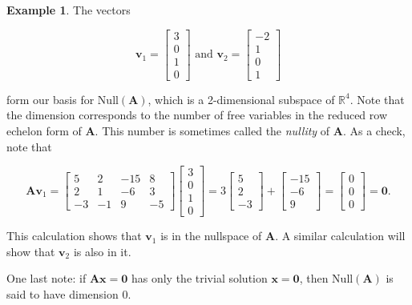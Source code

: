 \documentclass[
]{book}
\theoremstyle{definition}
\theoremstyle{definition}
\newtheorem{example}{Example}[chapter]
\theoremstyle{definition}
\theoremstyle{definition}
\theoremstyle{remark}
\begin{document}
\begin{examplebox}
\begin{example}
The vectors

\[\mathbf{v}_1=\begin{bmatrix}3\\0\\1\\0\end{bmatrix} \text{ and } \mathbf{v}_2=\begin{bmatrix}-2\\1\\0\\1\end{bmatrix}\]

form our basis for \(\text{Null}(\mathbf{A})\), which is a 2-dimensional subspace of \(\mathbb{R}^4\). Note that the dimension corresponds to the number of free variables in the reduced row echelon form of \(\mathbf{A}.\) This number is sometimes called the \emph{nullity} of \(\mathbf{A}.\) As a check, note that

\[\mathbf{A}\mathbf{v}_1=\begin{bmatrix}5 & 2 & -15 & 8\\2 & 1 & -6 & 3\\-3 & -1 & 9 & -5\end{bmatrix}\begin{bmatrix}3\\0\\1\\0\end{bmatrix}=3\begin{bmatrix}5\\2\\-3\end{bmatrix}+\begin{bmatrix}-15\\-6\\9\end{bmatrix}=\begin{bmatrix}0\\0\\0\end{bmatrix}=\mathbf{0}.\]

This calculation shows that \(\mathbf{v}_1\) is in the nullspace of \(\mathbf{A}\). A similar calculation will show that \(\mathbf{v}_2\) is also in it.
\end{example}

\end{examplebox}

One last note: if \(\mathbf{A}\mathbf{x}=\mathbf{0}\) has only the trivial solution \(\mathbf{x}=\mathbf{0}\), then \(\text{Null}(\mathbf{A})\) is said to have dimension 0.
\end{document}
